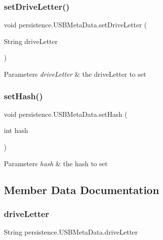 \subsubsection{\texorpdfstring{set\+Drive\+Letter()}{setDriveLetter()}}
{\footnotesize\ttfamily void persistence.\+U\+S\+B\+Meta\+Data.\+set\+Drive\+Letter (\begin{DoxyParamCaption}\item[{String}]{drive\+Letter }\end{DoxyParamCaption})}


\begin{DoxyParams}{Parameters}
{\em drive\+Letter} & the drive\+Letter to set \\
\hline
\end{DoxyParams}
\mbox{\label{classpersistence_1_1_u_s_b_meta_data_ad0d7cd79038aeadfd2c66482c2bab8b3}} 
\subsubsection{\texorpdfstring{set\+Hash()}{setHash()}}
{\footnotesize\ttfamily void persistence.\+U\+S\+B\+Meta\+Data.\+set\+Hash (\begin{DoxyParamCaption}\item[{int}]{hash }\end{DoxyParamCaption})}


\begin{DoxyParams}{Parameters}
{\em hash} & the hash to set \\
\hline
\end{DoxyParams}


\subsection{Member Data Documentation}
\mbox{\label{classpersistence_1_1_u_s_b_meta_data_a4a566816eb5a831dda4b8c153891480f}} 
\subsubsection{\texorpdfstring{drive\+Letter}{driveLetter}}
{\footnotesize\ttfamily String persistence.\+U\+S\+B\+Meta\+Data.\+drive\+Letter\hspace{0.3cm}{\ttfamily [private]}}

